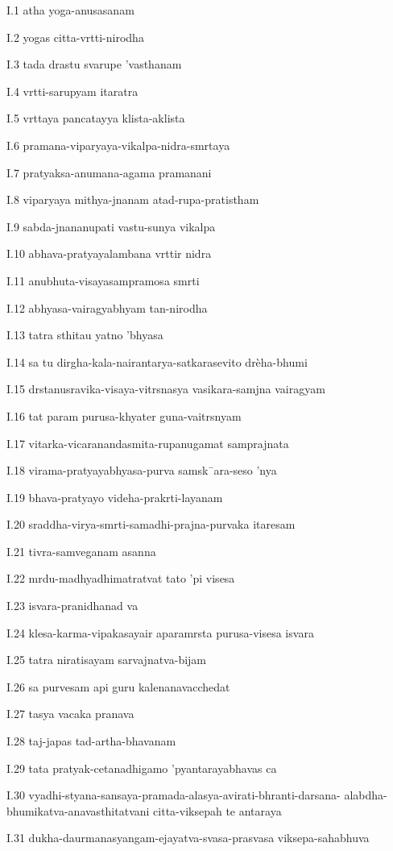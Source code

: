 I.1
atha yoga-anusasanam

I.2
yogas citta-vrtti-nirodha

I.3
tada drastu svarupe 'vasthanam

I.4
vrtti-sarupyam itaratra

I.5
vrttaya pancatayya klista-aklista

I.6
pramana-viparyaya-vikalpa-nidra-smrtaya

I.7
pratyaksa-anumana-agama pramanani

I.8
viparyaya mithya-jnanam atad-rupa-pratistham

I.9
sabda-jnananupati vastu-sunya vikalpa

I.10
abhava-pratyayalambana vrttir nidra

I.11
anubhuta-visayasampramosa smrti

I.12
abhyasa-vairagyabhyam tan-nirodha

I.13
tatra sthitau yatno 'bhyasa

I.14
sa tu dirgha-kala-nairantarya-satkarasevito drèha-bhumi

I.15
drstanusravika-visaya-vitrsnasya vasikara-samjna vairagyam

I.16
tat param purusa-khyater guna-vaitrsnyam

I.17
vitarka-vicaranandasmita-rupanugamat samprajnata

I.18
virama-pratyayabhyasa-purva samsk¯ara-seso 'nya

I.19
bhava-pratyayo videha-prakrti-layanam

I.20
sraddha-virya-smrti-samadhi-prajna-purvaka itaresam

I.21
tivra-samveganam asanna

I.22
mrdu-madhyadhimatratvat tato 'pi visesa

I.23
isvara-pranidhanad va

I.24
klesa-karma-vipakasayair aparamrsta purusa-visesa isvara

I.25
tatra niratisayam sarvajnatva-bijam

I.26
sa purvesam api guru kalenanavacchedat

I.27
tasya vacaka pranava

I.28
taj-japas tad-artha-bhavanam

I.29
tata pratyak-cetanadhigamo 'pyantarayabhavas ca

I.30
vyadhi-styana-sansaya-pramada-alasya-avirati-bhranti-darsana-
alabdha-bhumikatva-anavasthitatvani citta-viksepah te antaraya

I.31
dukha-daurmanasyangam-ejayatva-svasa-prasvasa viksepa-sahabhuva

